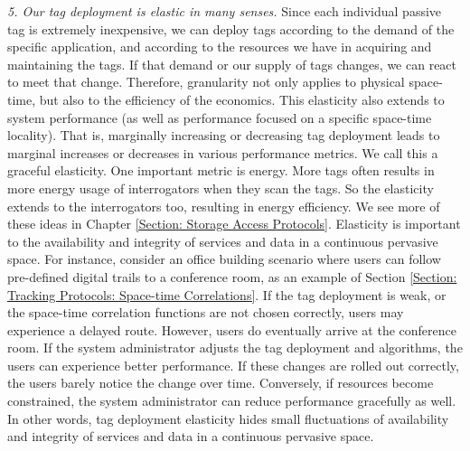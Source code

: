 \emph{5. Our tag deployment is elastic in many senses.} Since each individual passive tag is extremely inexpensive, we can deploy tags according to the demand of the specific application, and according to the resources we have in acquiring and maintaining the tags. If that demand or our supply of tags changes, we can react to meet that change. Therefore, granularity not only applies to physical space-time, but also to the efficiency of the economics. This elasticity also extends to system performance (as well as performance focused on a specific space-time locality). That is, marginally increasing or decreasing tag deployment leads to marginal increases or decreases in various performance metrics. We call this a graceful elasticity. One important metric is energy. More tags often results in more energy usage of interrogators when they scan the tags. So the elasticity extends to the interrogators too, resulting in energy efficiency. We see more of these ideas in Chapter \ref{Section: Storage Access Protocols}. Elasticity is important to the availability and integrity of services and data in a continuous pervasive space. For instance, consider an office building scenario where users can follow pre-defined digital trails to a conference room, as an example of Section \ref{Section: Tracking Protocols: Space-time Correlations}. If the tag deployment is weak, or the space-time correlation functions are not chosen correctly, users may experience a delayed route. However, users do eventually arrive at the conference room. If the system administrator adjusts the tag deployment and algorithms, the users can experience better performance. If these changes are rolled out correctly, the users barely notice the change over time. Conversely, if resources become constrained, the system administrator can reduce performance gracefully as well. In other words, tag deployment elasticity hides small fluctuations of availability and integrity of services and data in a continuous pervasive space.

